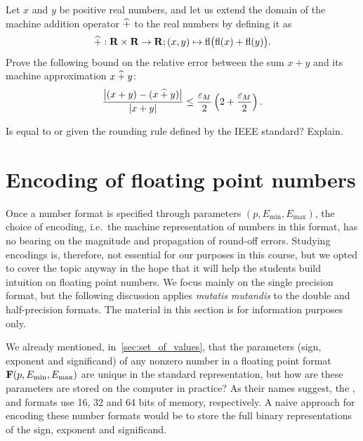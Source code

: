 \begin{exercise}
    Let $x$ and $y$ be positive real numbers,
    and let us extend the domain of the machine addition operator $\mathbin{\widehat +}$ to the real numbers by defining it as
    \[
        \mathbin{\widehat +}: \mathbf R \times \mathbf R \to \mathbf R; (x, y) \mapsto {\rm fl} \bigl({\rm fl}(x) + {\rm fl}(y)\bigr).
    \]
    Prove the following bound on the relative error between the sum $x+y$ and its machine approximation $x \mathbin{\widehat +} y$:
    \[
        \frac{\bigl| (x + y) - (x \mathbin{\widehat +}  y ) \bigr|}{|x + y|}
        \leq \frac{\varepsilon_M}{2}  \left(2 + \frac{\varepsilon_M}{2}\right).
    \]
\end{exercise}

\begin{exercise}
    Is  equal to  or 
    given the rounding rule defined by the IEEE standard? Explain.
\end{exercise}

\section{Encoding of floating point numbers}%
\label{sec:encoding_of_floating_point_numbers}

Once a number format is specified through parameters $(p, E_{\min}, E_{\max})$,
the choice of encoding,
i.e.\ the machine representation of numbers in this format,
has no bearing on the magnitude and propagation of round-off errors.
Studying encodings is, therefore, not essential for our purposes in this course,
but we opted to cover the topic anyway in the hope that it will help the students build intuition on floating point numbers.
We focus mainly on the single precision format,
but the following discussion applies \emph{mutatis mutandis} to the double and half-precision formats.
The material in this section is for information purposes only.

We already mentioned, in~\cref{sec:set_of_values},
that the parameters (sign, exponent and significand) of any nonzero number in a floating point format $\mathbf F(p, E_{\min}, E_{\max})$ are unique in the standard representation,
but how are these parameters are stored on the computer in practice?
As their names suggest, the ,  and  formats use 16, 32 and 64 bits of memory, respectively.
A naive approach for encoding these number formats would be to store the full binary representations of the sign, exponent and significand.


